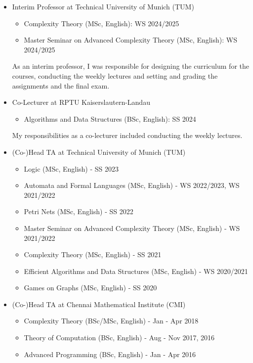 \documentclass[11pt,a4paper,sans]{moderncv}        %
\begin{document}
\begin{itemize}
	\setlength\itemsep{5pt}
	\item Interim Professor at Technical University of Munich (TUM)
	\vspace{2pt}
	\begin{itemize}
		\setlength\itemsep{2pt}
		\item Complexity Theory (MSc, English): WS 2024/2025
		\item Master Seminar on Advanced Complexity Theory (MSc, English): WS 2024/2025
	\end{itemize}
	\vspace{4pt}
	
	As an interim professor, I was responsible for designing the curriculum for the courses, conducting the weekly lectures and setting and grading the assignments and the final exam.	
	
	\item Co-Lecturer at RPTU Kaiserslautern-Landau
	\vspace{2pt}
	\begin{itemize}
		\setlength\itemsep{2pt}
		\item Algorithms and Data Structures (BSc, English): SS 2024	
	\end{itemize}
	\vspace{4pt}
	
	My responsibilities as a co-lecturer included conducting the weekly lectures.
	
	\item (Co-)Head TA at Technical University of Munich (TUM)
	\vspace{2pt}
	\begin{itemize}
		\setlength\itemsep{2pt}
		\item Logic (MSc, English) - SS 2023
		\item Automata and Formal Languages (MSc, English) - WS 2022/2023, WS 2021/2022
		\item Petri Nets (MSc, English) - SS 2022
		\item Master Seminar on Advanced Complexity Theory (MSc, English) - WS 2021/2022
		\item Complexity Theory (MSc, English) - SS 2021
		\item Efficient Algorithms and Data Structures (MSc, English) - WS 2020/2021
		\item Games on Graphs (MSc, English) - SS 2020
	\end{itemize}
	
	\item (Co-)Head TA at Chennai Mathematical Institute (CMI)
	\vspace{2pt}
	\begin{itemize}
		\setlength\itemsep{2pt}
		\item Complexity Theory (BSc/MSc, English) - Jan - Apr 2018
		\item Theory of Computation (BSc, English) - Aug - Nov 2017, 2016
		\item Advanced Programming (BSc, English) - Jan - Apr 2016
	\end{itemize}
	

\end{itemize}
\end{document}
